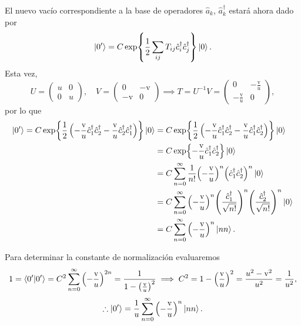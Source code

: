 \documentclass{scrartcl}
\newcommand{\inv}[1]{\frac{1}{#1}}
\renewcommand{\a}{\hat{a}}
\renewcommand{\c}{\hat{c}}
\DeclareRobustCommand{\[}{\begin{equation}}
\DeclareRobustCommand{\]}{\end{equation}}
\begin{document}
\begin{enumerate}
\begin{enumerate}
\begin{enumerate}[(i)]
            El nuevo vacío correspondiente a la base de operadores $\a_k$, $\a_k^\dagger$ estará ahora dado por
            \[ \ket{0'} = C \exp{\inv{2} \sum_{ij} T_{ij} \c_i^\dagger \c_j^\dagger} \ket{0}. \]
            Esta vez,
            \[ U = \begin{pmatrix} u & 0 \\ 0 & u \end{pmatrix}, \quad V = \begin{pmatrix} 0 & -\mathrm{v} \\ -\mathrm{v} & 0 \end{pmatrix} \implies T = U^{-1} V = \begin{pmatrix} 0 & -\frac{\mathrm{v}}{u} \\ -\frac{\mathrm{v}}{u} & 0 \end{pmatrix}, \]
            por lo que
            \begin{align}
                \ket{0'} = C \exp{\inv{2} \left( -\frac{\mathrm{v}}{u} \c_1^\dagger \c_2^\dagger - \frac{\mathrm{v}}{u} \c_2^\dagger \c_1^\dagger \right)} \ket{0} &= C \exp{\inv{2} \left( -\frac{\mathrm{v}}{u} \c_1^\dagger \c_2^\dagger - \frac{\mathrm{v}}{u} \c_1^\dagger \c_2^\dagger \right)} \ket{0} \\
                    &= C \exp{-\frac{\mathrm{v}}{u} \c_1^\dagger \c_2^\dagger} \ket{0} \\
                    &= C \sum_{n = 0}^\infty \inv{n!} \qty(-\frac{\mathrm{v}}{u})^n \qty(\c_1^\dagger \c_2^\dagger)^n \ket{0} \\
                    &= C \sum_{n = 0}^\infty \qty(-\frac{\mathrm{v}}{u})^n \qty(\frac{\c_1^\dagger}{\sqrt{n!}})^n \qty(\frac{\c_2^\dagger}{\sqrt{n!}})^n \ket{0} \\
                    &= C \sum_{n = 0}^\infty \qty(-\frac{\mathrm{v}}{u})^n \ket{nn}.
            \end{align}
            
            Para determinar la constante de normalización evaluaremos
            \[ 1 = \ip{0'}{0'} = C^2 \sum_{n = 0}^\infty \qty(-\frac{\mathrm{v}}{u})^{2n} = \frac{1}{1-\qty(\frac{\mathrm{v}}{u})^2} \implies C^2 = 1 - \qty(\frac{\mathrm{v}}{u})^2 = \frac{u^2 - \mathrm{v}^2}{u^2} = \inv{u^2}, \]
            \[ \therefore \ket{0'} = \inv{u} \sum_{n = 0}^\infty \qty(-\frac{\mathrm{v}}{u})^n \ket{nn}. \]
            
        \end{enumerate}
    \end{enumerate}
    

\end{enumerate}
\end{document}
